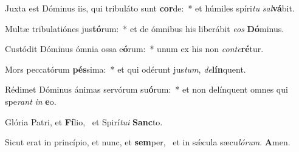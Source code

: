 \item Juxta est Dóminus iis, qui tribuláto sunt \textbf{cor}de:~* et húmiles spíri\textit{tu} \textit{sal}\textbf{vá}bit.
\item Multæ tribulatiónes jus\textbf{tó}\-rum:~* et de ómnibus his liberábit \textit{e}\textit{os} \textbf{Dó}minus.
\item Custódit Dóminus ómnia ossa e\textbf{ó}rum:~* unum ex his non \textit{con}\textit{te}\textbf{ré}tur.
\item Mors peccatórum \textbf{pés}sima:~* et qui odérunt jus\textit{tum}, \textit{de}\textbf{lín}quent.
\item Rédimet Dóminus ánimas servórum su\textbf{ó}rum:~* et non delínquent omnes qui spe\textit{rant} \textit{in} \textbf{e}o.
\item Glória Patri, et \textbf{Fí}lio,~\psstar{} et Spirí\textit{tu}\textit{i} \textbf{Sanc}to.
\item Sicut erat in princípio, et nunc, et \textbf{sem}per,~\psstar{} et in sǽcula sæcu\textit{ló}\textit{rum}. \textbf{A}men.
